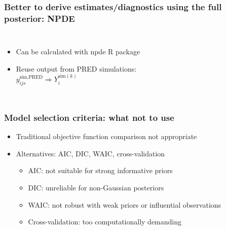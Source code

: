 \documentclass[handout]{beamer}
\begin{document}
\begin{frame}
  \frametitle{Better to derive estimates/diagnostics using the full posterior: NPDE}

  \begin{columns}
\begin{itemize}
  \item Can be calculated with npde R package
  \item Reuse output from PRED simulations:\\
  $y_{ijs}^{\text{sim,PRED}} \Rightarrow Y_i^{\text{sim}(k)}$
\end{itemize}
    \cite{Comets2008-lz}
  \end{columns}

\end{frame}

\begin{frame}
  \frametitle{Model selection criteria: what not to use}

\begin{itemize}
  \item Traditional objective function comparison not appropriate
  \item Alternatives: AIC, DIC, WAIC, cross-validation
        \begin{itemize}
          \item \textcolor{mrggreen}{AIC}: not suitable for strong informative priors
          \item \textcolor{mrggreen}{DIC}: unreliable for non-Gaussian posteriors
          \item \textcolor{mrggreen}{WAIC}: not robust with weak priors or influential observations
          \item \textcolor{mrggreen}{Cross-validation}: too computationally demanding
        \end{itemize}
\end{itemize}

\end{frame}
\end{document}
